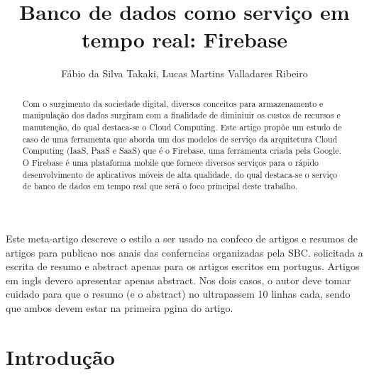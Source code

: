 \documentclass[12pt]{article}
\title{Banco de dados como serviço em tempo real: Firebase}
\author{Fábio da Silva Takaki\inst{1}, Lucas Martins Valladares Ribeiro\inst{1} }
\begin{document}
 

\maketitle

\begin{abstract}
    Com o surgimento da sociedade digital, diversos conceitos para armazenamento e manipulação dos dados surgiram com a finalidade de diminiuir os custos de recursos e manutenção, do qual destaca-se o Cloud Computing. Este artigo propõe um estudo de caso de uma ferramenta que aborda um dos modelos de serviço da arquitetura Cloud Computing (IaaS, PaaS e SaaS) que é o Firebase, uma ferramenta criada pela Google. O Firebase é uma plataforma mobile que fornece diversos serviços para o rápido desenvolvimento de aplicativos móveis de alta qualidade, do qual destaca-se o serviço de banco de dados em tempo real que será o foco principal deste trabalho.
\end{abstract}
     
\begin{resumo} 
  Este meta-artigo descreve o estilo a ser usado na confeco de artigos e
  resumos de artigos para publicao nos anais das conferncias organizadas
  pela SBC.  solicitada a escrita de resumo e abstract apenas para os artigos
  escritos em portugus. Artigos em ingls devero apresentar apenas abstract.
  Nos dois casos, o autor deve tomar cuidado para que o resumo (e o abstract)
  no ultrapassem 10 linhas cada, sendo que ambos devem estar na primeira
  pgina do artigo.
\end{resumo}


\section{Introdução}
\end{document}
